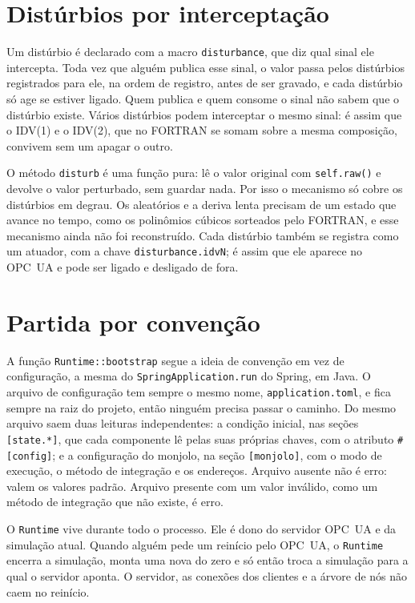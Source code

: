 \section{Distúrbios por interceptação}
\label{apC:disturbios}

Um distúrbio é declarado com a macro \texttt{disturbance}, que diz qual sinal ele intercepta. Toda vez que alguém publica esse sinal, o valor passa pelos distúrbios registrados para ele, na ordem de registro, antes de ser gravado, e cada distúrbio só age se estiver ligado. Quem publica e quem consome o sinal não sabem que o distúrbio existe. Vários distúrbios podem interceptar o mesmo sinal: é assim que o IDV(1) e o IDV(2), que no FORTRAN se somam sobre a mesma composição, convivem sem um apagar o outro.

O método \texttt{disturb} é uma função pura: lê o valor original com \texttt{self.raw()} e devolve o valor perturbado, sem guardar nada. Por isso o mecanismo só cobre os distúrbios em degrau. Os aleatórios e a deriva lenta precisam de um estado que avance no tempo, como os polinômios cúbicos sorteados pelo FORTRAN, e esse mecanismo ainda não foi reconstruído. Cada distúrbio também se registra como um atuador, com a chave \texttt{disturbance.idvN}; é assim que ele aparece no OPC~UA e pode ser ligado e desligado de fora.

\section{Partida por convenção}
\label{apC:bootstrap}

A função \texttt{Runtime::bootstrap} segue a ideia de convenção em vez de configuração, a mesma do \texttt{SpringApplication.run} do Spring, em Java. O arquivo de configuração tem sempre o mesmo nome, \texttt{application.toml}, e fica sempre na raiz do projeto, então ninguém precisa passar o caminho. Do mesmo arquivo saem duas leituras independentes: a condição inicial, nas seções \texttt{[state.*]}, que cada componente lê pelas suas próprias chaves, com o atributo \texttt{\#[config]}; e a configuração do monjolo, na seção \texttt{[monjolo]}, com o modo de execução, o método de integração e os endereços. Arquivo ausente não é erro: valem os valores padrão. Arquivo presente com um valor inválido, como um método de integração que não existe, é erro.

O \texttt{Runtime} vive durante todo o processo. Ele é dono do servidor OPC~UA e da simulação atual. Quando alguém pede um reinício pelo OPC~UA, o \texttt{Runtime} encerra a simulação, monta uma nova do zero e só então troca a simulação para a qual o servidor aponta. O servidor, as conexões dos clientes e a árvore de nós não caem no reinício.

